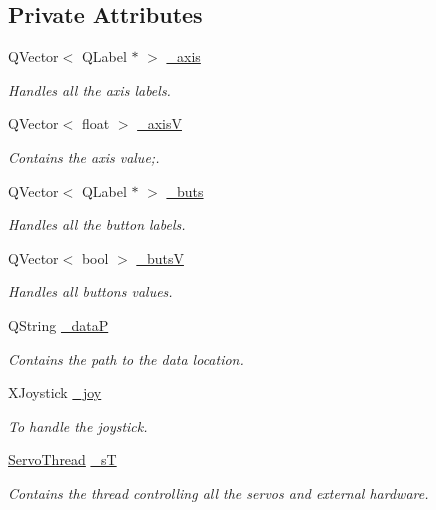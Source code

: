 \subsection*{Private Attributes}
\begin{DoxyCompactItemize}
\item 
Q\+Vector$<$ Q\+Label $\ast$ $>$ \hyperlink{a00005_a30c99d7a544f74b0650758e5cc7ead5a}{\+\_\+axis}
\begin{DoxyCompactList}\small\item\em Handles all the axis labels. \end{DoxyCompactList}\item 
Q\+Vector$<$ float $>$ \hyperlink{a00005_a20f66f574ed4c96d8dfc0013e1095f15}{\+\_\+axis\+V}
\begin{DoxyCompactList}\small\item\em Contains the axis value;. \end{DoxyCompactList}\item 
Q\+Vector$<$ Q\+Label $\ast$ $>$ \hyperlink{a00005_a8eaf474e1b8672f32873ed009e28ce8a}{\+\_\+buts}
\begin{DoxyCompactList}\small\item\em Handles all the button labels. \end{DoxyCompactList}\item 
Q\+Vector$<$ bool $>$ \hyperlink{a00005_a519ae4630572cb63fbd04bce12fe8e77}{\+\_\+buts\+V}
\begin{DoxyCompactList}\small\item\em Handles all buttons values. \end{DoxyCompactList}\item 
Q\+String \hyperlink{a00005_aaccbe653019df03668429890e325ac21}{\+\_\+data\+P}
\begin{DoxyCompactList}\small\item\em Contains the path to the data location. \end{DoxyCompactList}\item 
X\+Joystick \hyperlink{a00005_a671f35800890e518713e1946671d8730}{\+\_\+joy}
\begin{DoxyCompactList}\small\item\em To handle the joystick. \end{DoxyCompactList}\item 
\hyperlink{a00009}{Servo\+Thread} \hyperlink{a00005_a97f8ecc7ecb930b796178cef7b975013}{\+\_\+s\+T}
\begin{DoxyCompactList}\small\item\em Contains the thread controlling all the servos and external hardware. \end{DoxyCompactList}\item 

\end{DoxyCompactItemize}
